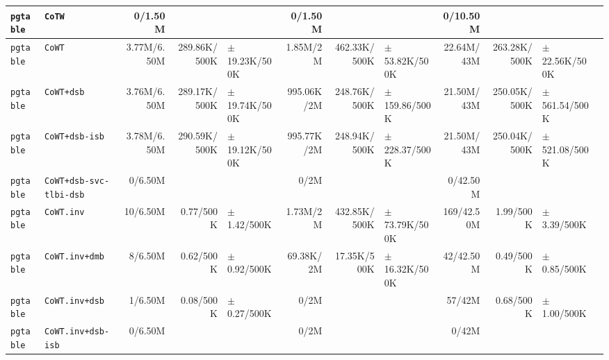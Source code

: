 \begin{tabular}{l l  | r r l | r r l | r r l l}
        \verb|pgtable| &                                                 \verb|CoTW| &        0/1.50M &                       &                   &        0/1.50M &                       &                   &       0/10.50M &                       &                    & \\ \hline 
        \verb|pgtable| &                                                 \verb|CoWT| &    3.77M/6.50M &          289.86K/500K & $\pm$ 19.23K/500K &       1.85M/2M &          462.33K/500K & $\pm$ 53.82K/500K &     22.64M/43M &          263.28K/500K &  $\pm$ 22.56K/500K & \\ \hline 
        \verb|pgtable| &                                             \verb|CoWT+dsb| &    3.76M/6.50M &          289.17K/500K & $\pm$ 19.74K/500K &     995.06K/2M &          248.76K/500K & $\pm$ 159.86/500K &     21.50M/43M &          250.05K/500K &  $\pm$ 561.54/500K & \\ \hline 
        \verb|pgtable| &                                         \verb|CoWT+dsb-isb| &    3.78M/6.50M &          290.59K/500K & $\pm$ 19.12K/500K &     995.77K/2M &          248.94K/500K & $\pm$ 228.37/500K &     21.50M/43M &          250.04K/500K &  $\pm$ 521.08/500K & \\ \hline 
        \verb|pgtable| &                                \verb|CoWT+dsb-svc-tlbi-dsb| &        0/6.50M &                       &                   &           0/2M &                       &                   &       0/42.50M &                       &                    & \\ \hline 
        \verb|pgtable| &                                             \verb|CoWT.inv| &       10/6.50M &             0.77/500K &   $\pm$ 1.42/500K &       1.73M/2M &          432.85K/500K & $\pm$ 73.79K/500K &     169/42.50M &             1.99/500K &    $\pm$ 3.39/500K & \\ \hline 
        \verb|pgtable| &                                         \verb|CoWT.inv+dmb| &        8/6.50M &             0.62/500K &   $\pm$ 0.92/500K &      69.38K/2M &           17.35K/500K & $\pm$ 16.32K/500K &      42/42.50M &             0.49/500K &    $\pm$ 0.85/500K & \\ \hline 
        \verb|pgtable| &                                         \verb|CoWT.inv+dsb| &        1/6.50M &             0.08/500K &   $\pm$ 0.27/500K &           0/2M &                       &                   &         57/42M &             0.68/500K &    $\pm$ 1.00/500K & \\ \hline 
        \verb|pgtable| &                                     \verb|CoWT.inv+dsb-isb| &        0/6.50M &                       &                   &           0/2M &                       &                   &          0/42M &                       &                    & \\ \hline 

\end{tabular}
